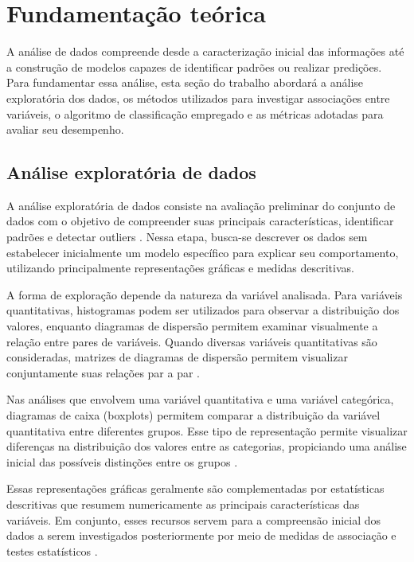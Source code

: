 \documentclass[12pt]{article}
\begin{document}
\section{Fundamentação teórica}

A análise de dados compreende desde a caracterização inicial das informações até a construção de modelos capazes de identificar padrões ou realizar predições. Para fundamentar essa análise, esta seção do trabalho abordará a análise exploratória dos dados, os métodos utilizados para investigar associações entre variáveis, o algoritmo de classificação empregado e as métricas adotadas para avaliar seu desempenho.

\subsection{Análise exploratória de dados}

A análise exploratória de dados consiste na avaliação preliminar do conjunto de dados com o objetivo de compreender suas principais características, identificar padrões e detectar outliers \cite{tukey1977eda}. Nessa etapa, busca-se descrever os dados sem estabelecer inicialmente um modelo específico para explicar seu comportamento, utilizando principalmente representações gráficas e medidas descritivas.

A forma de exploração depende da natureza da variável analisada. Para variáveis quantitativas, histogramas podem ser utilizados para observar a distribuição dos valores, enquanto diagramas de dispersão permitem examinar visualmente a relação entre pares de variáveis. Quando diversas variáveis quantitativas são consideradas, matrizes de diagramas de dispersão permitem visualizar conjuntamente suas relações par a par \cite{james2023islp}.

Nas análises que envolvem uma variável quantitativa e uma variável categórica, diagramas de caixa (boxplots) permitem comparar a distribuição da variável quantitativa entre diferentes grupos. Esse tipo de representação permite visualizar diferenças na distribuição dos valores entre as categorias, propiciando uma análise inicial das possíveis distinções entre os grupos \cite{james2023islp}.

Essas representações gráficas geralmente são complementadas por estatísticas descritivas que resumem numericamente as principais características das variáveis. Em conjunto, esses recursos servem para a compreensão inicial dos dados a serem investigados posteriormente por meio de medidas de associação e testes estatísticos \cite{james2023islp}.
\end{document}
